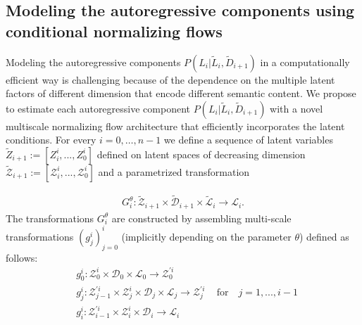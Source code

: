 \subsection{Modeling the autoregressive components using conditional normalizing flows}\label{ch1:Autoregressive-conditional-flow-components}
%

Modeling the autoregressive components $P(L_i|\tilde{L}_{i},\tilde D_{i+1})$ in a computationally efficient way is challenging because of the dependence on the multiple latent factors of different dimension that encode different semantic content. We propose to estimate each autoregressive component $P(L_i|\tilde{L}_{i},\tilde D_{i+1})$ with a novel multiscale normalizing flow architecture that efficiently incorporates the latent conditions. \color{black}For every $i=0, \ldots, n-1$ we define a sequence of latent variables $\tilde Z_{i+1} := [Z_{i}^{i},...,Z_0^{i}]$ defined on latent spaces of decreasing dimension $\tilde{\mathcal{Z}}_{i+1} := [\mathcal{Z}_{i}^{i},...,\mathcal{Z}_0^{i}]$ and a parametrized transformation

\begin{align*}
    G^\theta_i : \tilde{\mathcal{Z}}_{i+1} \times  \tilde{\mathcal{D}}_{i+1} \times  \tilde{\mathcal{L}}_{i} \rightarrow \mathcal{L}_{i}.
    \end{align*}
    The transformations $G^\theta_i$ are constructed by assembling multi-scale transformations $(g_j^i)_{j=0}^i$ (implicitly depending on the parameter $\theta$) defined as follows:
    \begin{align*}
    &g_0^i : \mathcal{Z}_0^i \times \mathcal{D}_0 \times \mathcal{L}_0 \rightarrow \mathcal{Z}_{0}^{\prime i} \\   
     &  g_{j}^{i}:\mathcal{Z}_{j-1}^{\prime i}\times \mathcal{Z}_{j}^{i} \times \mathcal{D}_{j} \times  \mathcal{L}_{j} \rightarrow \mathcal{Z}_{j}^{\prime i}\, \quad \text{for} \quad j=1,...,i-1\\
    &g_{i}^{i}: \mathcal{Z}_{i-1}^{\prime i}\times \mathcal{Z}_{i}^i \times \mathcal{D}_{i} \rightarrow     \mathcal{L}_{i}
\end{align*}

